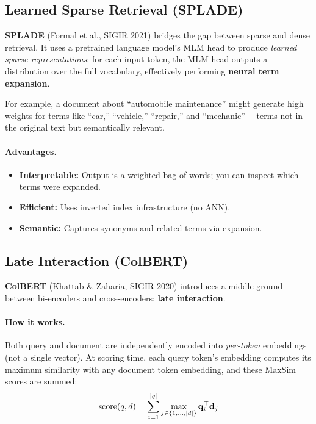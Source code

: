\subsection{Learned Sparse Retrieval (SPLADE)}

\textbf{SPLADE} (Formal et al., SIGIR 2021) bridges the gap between sparse and
dense retrieval.  It uses a pretrained language model's MLM head to produce
\emph{learned sparse representations}: for each input token, the MLM head
outputs a distribution over the full vocabulary, effectively performing
\textbf{neural term expansion}.

For example, a document about ``automobile maintenance'' might generate high
weights for terms like ``car,'' ``vehicle,'' ``repair,'' and ``mechanic''---
terms not in the original text but semantically relevant.

\paragraph{Advantages.}
\begin{itemize}
    \item \textbf{Interpretable:} Output is a weighted bag-of-words; you can
          inspect which terms were expanded.
    \item \textbf{Efficient:} Uses inverted index infrastructure (no ANN).
    \item \textbf{Semantic:} Captures synonyms and related terms via expansion.
\end{itemize}

\subsection{Late Interaction (ColBERT)}

\textbf{ColBERT} (Khattab \& Zaharia, SIGIR 2020) introduces a middle ground
between bi-encoders and cross-encoders: \textbf{late interaction}.

\paragraph{How it works.}
Both query and document are independently encoded into \emph{per-token}
embeddings (not a single vector).  At scoring time, each query token's
embedding computes its maximum similarity with any document token embedding,
and these MaxSim scores are summed:
\[
    \text{score}(q, d) = \sum_{i=1}^{|q|}
    \max_{j \in \{1,\ldots,|d|\}} \mathbf{q}_i^\top \mathbf{d}_j
\]

